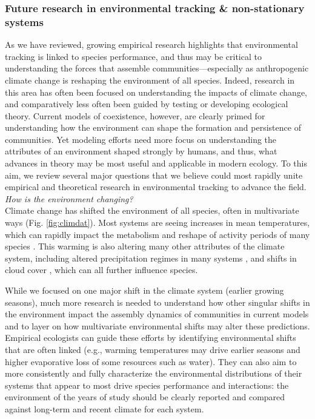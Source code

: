 \documentclass[11pt,letterpaper]{article}
\begin{document}
\subsubsection{Future research in environmental tracking \& non-stationary systems}
As we have reviewed, growing empirical research highlights that environmental tracking is linked to species performance, and thus may be critical to understanding the forces that assemble communities---especially as anthropogenic climate change is reshaping the environment of all species. Indeed, research in this area has often been focused on understanding the impacts of climate change, and comparatively less often been guided by testing or developing ecological theory. Current models of coexistence, however, are clearly primed for understanding how the environment can shape the formation and persistence of communities. Yet modeling efforts need more focus on understanding the attributes of an environment shaped strongly by humans, and thus, what advances in theory may be most useful and applicable in modern ecology. To this aim, we review several major questions that we believe could most rapidly unite empirical and theoretical research in environmental tracking to advance the field.\\

\emph{How is the environment changing?} \\ %

Climate change has shifted the environment of all species, often in multivariate ways (Fig. \ref{fig:climdat}). Most systems are seeing increases in mean temperatures, which can rapidly impact the metabolism and reshape of activity periods of many species \citep{Monson:2006vt,IPCC:2014sm}. This warming is also altering many other attributes of the climate system, including altered precipitation regimes in many systems \citep{Diffenbaugh2015}, and shifts in cloud cover \citep{hofer2017}, which can all further influence species. 

While we focused on one major shift in the climate system (earlier growing seasons), much more research is needed to understand how other singular shifts in the environment impact the assembly dynamics of communities in current models and to layer on how multivariate environmental shifts may alter these predictions. Empirical ecologists can guide these efforts by identifying environmental shifts that are often linked (e.g., warming temperatures may drive earlier seasons and higher evaporative loss of some resources such as water). They can also aim to more consistently and fully characterize the environmental distributions of their systems that appear to most drive species performance and interactions: the environment of the years of study should be clearly reported and compared against long-term and recent climate for each system.\\
\end{document}
